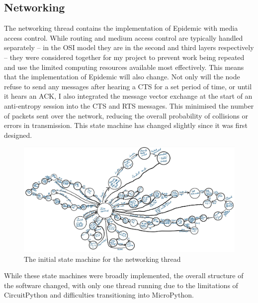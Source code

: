 \documentclass[12pt,a4paper]{report}
\begin{document}
\subsection{Networking}
The networking thread contains the implementation of Epidemic with media access control. While routing and medium access control are typically handled separately -- in the OSI model they are in the second and third layers respectively -- they were considered together for my project to prevent work being repeated and use the limited computing resources available most effectively. This means that the implementation of Epidemic will also change. Not only will the node refuse to send any messages after hearing a CTS for a set period of time, or until it hears an ACK, I also integrated the message vector exchange at the start of an anti-entropy session into the CTS and RTS messages. This minimised the number of packets sent over the network, reducing the overall probability of collisions or errors in transmission. This state machine has changed slightly since it was first designed. 
\begin{figure}[h]
\begin{center}
\caption{The initial state machine for the networking thread}
\includegraphics[scale=0.5]{net.jpg}
\end{center}
\end{figure}
\FloatBarrier
While these state machines were broadly implemented, the overall structure of the software changed, with only one thread running due to the limitations of CircuitPython and difficulties transitioning into MicroPython.


\end{document}
